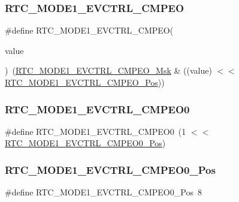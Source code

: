 \subsubsection{\texorpdfstring{RTC\_MODE1\_EVCTRL\_CMPEO}{RTC\_MODE1\_EVCTRL\_CMPEO}}
{\footnotesize\ttfamily \#define R\+T\+C\+\_\+\+M\+O\+D\+E1\+\_\+\+E\+V\+C\+T\+R\+L\+\_\+\+C\+M\+P\+EO(\begin{DoxyParamCaption}\item[{}]{value }\end{DoxyParamCaption})~(\mbox{\hyperlink{group___s_a_m_d21___r_t_c_gafcb84f65fdf444323b0b9ba698b79cb7}{R\+T\+C\+\_\+\+M\+O\+D\+E1\+\_\+\+E\+V\+C\+T\+R\+L\+\_\+\+C\+M\+P\+E\+O\+\_\+\+Msk}} \& ((value) $<$$<$ \mbox{\hyperlink{group___s_a_m_d21___r_t_c_ga0a18e318546dc40f49df011fda9bf956}{R\+T\+C\+\_\+\+M\+O\+D\+E1\+\_\+\+E\+V\+C\+T\+R\+L\+\_\+\+C\+M\+P\+E\+O\+\_\+\+Pos}}))}

\mbox{\label{group___s_a_m_d21___r_t_c_gaf50ea838de36344ef1a41cf4ee0d7ff5}} 
\subsubsection{\texorpdfstring{RTC\_MODE1\_EVCTRL\_CMPEO0}{RTC\_MODE1\_EVCTRL\_CMPEO0}}
{\footnotesize\ttfamily \#define R\+T\+C\+\_\+\+M\+O\+D\+E1\+\_\+\+E\+V\+C\+T\+R\+L\+\_\+\+C\+M\+P\+E\+O0~(1 $<$$<$ \mbox{\hyperlink{group___s_a_m_d21___r_t_c_ga37bab4782c298950d03ab4d937efa053}{R\+T\+C\+\_\+\+M\+O\+D\+E1\+\_\+\+E\+V\+C\+T\+R\+L\+\_\+\+C\+M\+P\+E\+O0\+\_\+\+Pos}})}

\mbox{\label{group___s_a_m_d21___r_t_c_ga37bab4782c298950d03ab4d937efa053}} 
\subsubsection{\texorpdfstring{RTC\_MODE1\_EVCTRL\_CMPEO0\_Pos}{RTC\_MODE1\_EVCTRL\_CMPEO0\_Pos}}
{\footnotesize\ttfamily \#define R\+T\+C\+\_\+\+M\+O\+D\+E1\+\_\+\+E\+V\+C\+T\+R\+L\+\_\+\+C\+M\+P\+E\+O0\+\_\+\+Pos~8}



